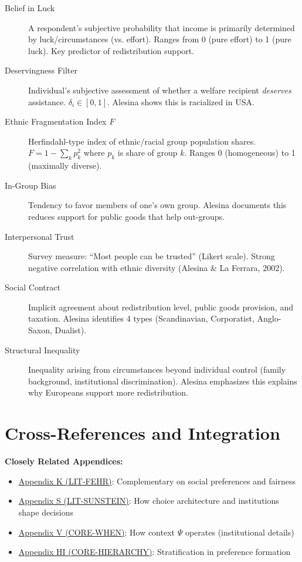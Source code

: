 \begin{description}

\item[Belief in Luck] A respondent's subjective probability that income is primarily determined by luck/circumstances (vs. effort). Ranges from 0 (pure effort) to 1 (pure luck). Key predictor of redistribution support.

\item[Deservingness Filter] Individual's subjective assessment of whether a welfare recipient \textit{deserves} assistance. $\delta_i \in [0,1]$. Alesina shows this is racialized in USA.

\item[Ethnic Fragmentation Index $F$] Herfindahl-type index of ethnic/racial group population shares. $F = 1 - \sum_k p_k^2$ where $p_k$ is share of group $k$. Ranges 0 (homogeneous) to 1 (maximally diverse).

\item[In-Group Bias] Tendency to favor members of one's own group. Alesina documents this reduces support for public goods that help out-groups.

\item[Interpersonal Trust] Survey measure: ``Most people can be trusted'' (Likert scale). Strong negative correlation with ethnic diversity (Alesina \& La Ferrara, 2002).

\item[Social Contract] Implicit agreement about redistribution level, public goods provision, and taxation. Alesina identifies 4 types (Scandinavian, Corporatist, Anglo-Saxon, Dualist).

\item[Structural Inequality] Inequality arising from circumstances beyond individual control (family background, institutional discrimination). Alesina emphasizes this explains why Europeans support more redistribution.

\end{description}

\section{Cross-References and Integration}
\label{sec:alesina-crossref}

\textbf{Closely Related Appendices:}

\begin{itemize}
\item \hyperref[app:lit-fehr]{Appendix K (LIT-FEHR)}: Complementary on social preferences and fairness
\item \hyperref[app:lit-sunstein]{Appendix S (LIT-SUNSTEIN)}: How choice architecture and institutions shape decisions
\item \hyperref[app:context-dimension]{Appendix V (CORE-WHEN)}: How context $\Psi$ operates (institutional details)
\item \hyperref[app:hierarchy]{Appendix HI (CORE-HIERARCHY)}: Stratification in preference formation
\end{itemize}

